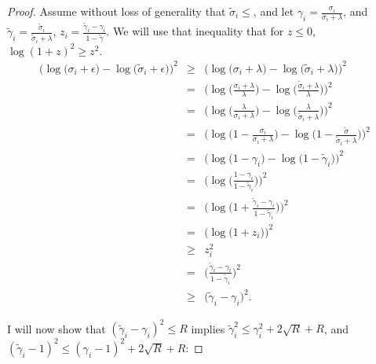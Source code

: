 \documentclass[12pt]{article}
\newcommand{\eps}{\epsilon}
\newcommand{\tsigma}{\tilde{\sigma}}
\newcommand{\tgamma}{\tilde{\gamma}}
\begin{document}
\begin{proof}
	Assume without loss of generality that $\tsigma_i \leq$, and let $\gamma_i=\frac{\sigma_i}{\sigma_i + \lambda}$, and $\tgamma_i=\frac{\tsigma_i}{\tsigma_i + \lambda}$, $z_i = \frac{\tgamma_i - \gamma_i}{1-\tgamma}$.  We will use that inequality that for $z \leq 0$, $\log(1+z)^2 \geq z^2$.
\begin{eqnarray*}
	\bigg(\log
	\Big(\sigma_i + \eps\Big) - \log\Big(\tsigma_i + \eps\Big)\bigg)^2 &\geq& 
	\bigg(\log
	\Big(\sigma_i + \lambda\Big) - \log\Big(\tsigma_i + \lambda\Big)\bigg)^2\\
	 &=& \bigg(\log\Big(\frac{\sigma_i + \lambda}{\lambda}\Big) - \log\Big(\frac{\tsigma_i + \lambda}{\lambda}\Big)\bigg)^2 \\
	&=& \bigg(\log\Big(\frac{\lambda}{\sigma_i + \lambda}\Big) - \log\Big(\frac{\lambda}{\tsigma_i + \lambda}\Big)\bigg)^2 \\
	&=& \bigg(\log\Big(1 - \frac{\sigma_i}{\sigma_i + \lambda}\Big) - \log\Big(1-\frac{\tsigma}{\tsigma_i + \lambda}\Big)\bigg)^2 \\
	&=& \bigg(\log\Big(1 - \gamma_i\Big) - \log\Big(1-\tgamma_i\Big)\bigg)^2 \\
	&=& \bigg(\log\Big(\frac{1-\gamma_i}{1-\tgamma_i}\Big)\bigg)^2 \\
	&=& \bigg(\log\Big(1 + \frac{\tgamma_i-\gamma_i}{1-\tgamma_i}\Big)\bigg)^2 \\
	&=& \bigg(\log\Big(1 + z_i\Big)\bigg)^2 \\
	&\geq& z_i^2 \\
	&=&  \bigg(\frac{\tgamma_i-\gamma_i}{1-\tgamma_i}\bigg)^2 \\
	&\geq&  \big(\tgamma_i-\gamma_i\big)^2.
\end{eqnarray*}	

I will now show that $(\tgamma_i - \gamma_i)^2 \leq R$ implies $\tgamma_i^2 \leq \gamma_i^2 + 2\sqrt{R}+R$, and $(\tgamma_i-1)^2 \leq (\gamma_i-1)^2 + 2\sqrt{R}+R$:


\end{proof}
\end{document}
